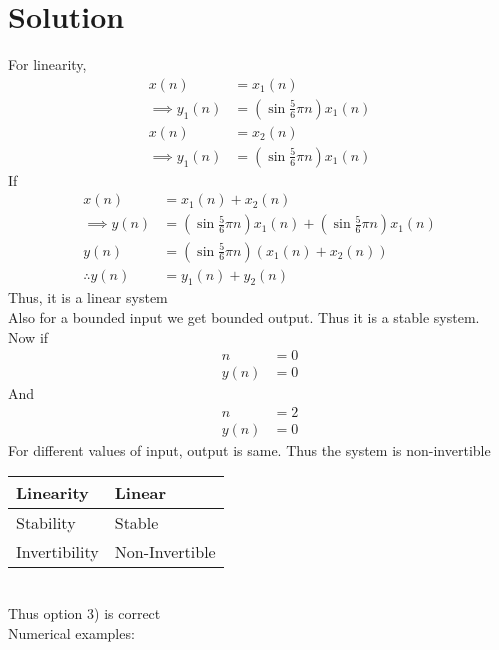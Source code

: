 \documentclass[journal,12pt,twocolumn]{IEEEtran}
\begin{document}
\section*{Solution}
For linearity,\\
\begin{align}
    x(n)&=x_1(n)\\
    \implies y_1(n)&=\left(\sin{\frac{5}{6}\pi n}\right)  x_1(n)\\
    x(n)&=x_2(n)\\
    \implies y_1(n)&=\left(\sin{\frac{5}{6}\pi n}\right) x_1(n)
\end{align}
If
\begin{align}
    x(n)&=x_1(n)+x_2(n)\\
    \implies y(n)&=\left(\sin{\frac{5}{6}\pi n}\right) x_1(n)+\left(\sin{\frac{5}{6}\pi n}\right) x_1(n)\\
    y(n)&=\left(\sin{\frac{5}{6}\pi n}\right)  \left(x_1(n)+x_2(n)\right)\\
    \therefore y(n)&=y_1(n)+y_2(n)
\end{align}
Thus, it is a linear system\\
Also for a bounded input we get bounded output. Thus it is a stable system.\\
Now if
\begin{align}
    n&=0\\
    y(n)&=0
\end{align}
And
\begin{align}
    n&=2\\
    y(n)&=0
\end{align}
For different values of input, output is same. Thus the system is non-invertible\\
\begin{table}[!ht]
\begin{tabular}{|l|l|}
\hline
Linearity     & Linear         \\ \hline
Stability     & Stable         \\ \hline
Invertibility & Non-Invertible \\ \hline
\end{tabular}
\end{table}\\
Thus option 3) is correct\\
Numerical examples:\\
\end{document}
